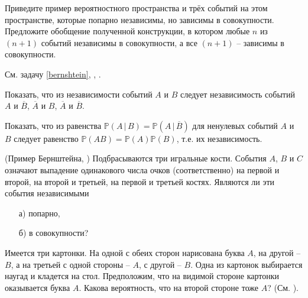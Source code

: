 
\begin{problem}
Приведите пример вероятностного пространства и трёх событий на этом пространстве, которые попарно независимы, но зависимы в совокупности. Предложите обобщение полученной конструкции, в котором любые $n$ из $(n+1)$ событий независимы в совокупности, а все $(n+1)$ -- зависимы в совокупности.
\end{problem}

\begin{ordre}
См. задачу \ref{bernshtein}, \cite{book12}, \cite{stoianov}.
\end{ordre}

\begin{problem}
Показать, что из независимости событий $A$ и $B$ следует независимость событий $A$ и $\overline B$, $\overline A$ и $B$, 
$\overline A$ и $\overline B$. 
\end{problem}


\begin{problem}
Показать, что из равенства ${\mathbb P}(A\, |\, B)={\mathbb P}(A\, |\, \overline B)$ для ненулевых событий $A$ и $B$ следует 
равенство ${\mathbb P}(AB)={\mathbb P}(A){\mathbb P}(B)$, т.е. их независимость. 
\end{problem}


\begin{problem}(Пример Бернштейна, \cite{stoianov})
\label{bernshtein}
Подбрасываются три игральные кости. События $A$, $B$ и $C$ означают выпадение одинакового числа очков (соответственно) на первой и 
второй, на второй и третьей, на первой и третьей костях. Являются ли эти события независимыми 
\begin{enumerate}
\item[а)] попарно, 
\item[б)] в совокупности? 
\end{enumerate}
\end{problem}


\begin{problem}
Имеется три картонки. На одной с обеих сторон нарисована буква $A$, на другой -- $B$, а на третьей с одной стороны -- $A$, с другой -- $B$. Одна из картонок выбирается наугад и кладется на стол. Предположим, что на видимой стороне картонки оказывается буква $A$. Какова вероятность, что на второй стороне тоже $A$?  (См. \cite{2013}).
\end{problem}




